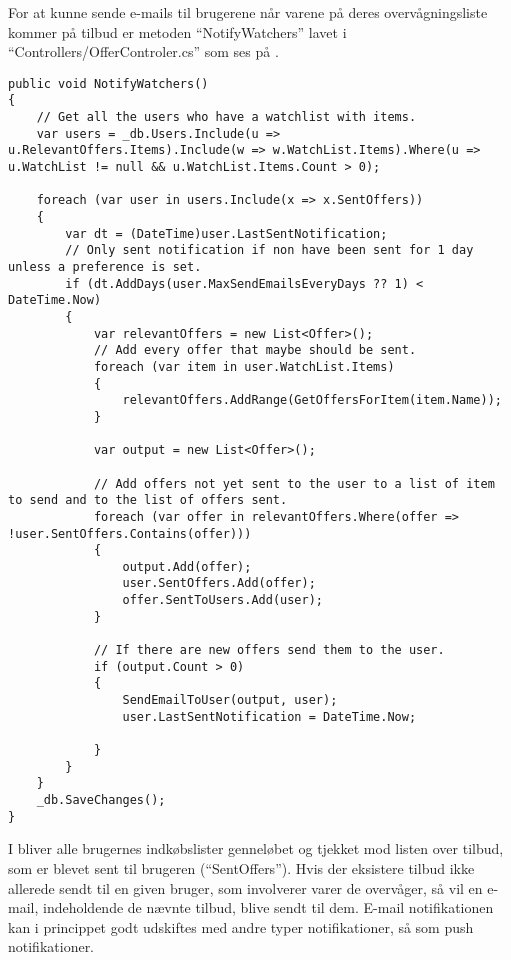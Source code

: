 For at kunne sende e-mails til brugerene når varene på deres overvågningsliste kommer på tilbud er metoden ``NotifyWatchers'' lavet i ``Controllers/OfferControler.cs'' som ses på . 
\begin{lstlisting}[caption="Metoden ``NotifyWatcher som finder de tilbud som skal sendes til hver user og sender dem.''",label=notifywatcherlisting]
public void NotifyWatchers()
{
    // Get all the users who have a watchlist with items.
    var users = _db.Users.Include(u => u.RelevantOffers.Items).Include(w => w.WatchList.Items).Where(u => u.WatchList != null && u.WatchList.Items.Count > 0);

    foreach (var user in users.Include(x => x.SentOffers))
    {
        var dt = (DateTime)user.LastSentNotification;
        // Only sent notification if non have been sent for 1 day unless a preference is set.
        if (dt.AddDays(user.MaxSendEmailsEveryDays ?? 1) < DateTime.Now)
        {
            var relevantOffers = new List<Offer>();
            // Add every offer that maybe should be sent. 
            foreach (var item in user.WatchList.Items)
            {
                relevantOffers.AddRange(GetOffersForItem(item.Name));
            }

            var output = new List<Offer>();

            // Add offers not yet sent to the user to a list of item to send and to the list of offers sent.
            foreach (var offer in relevantOffers.Where(offer => !user.SentOffers.Contains(offer)))
            {
                output.Add(offer);
                user.SentOffers.Add(offer);
                offer.SentToUsers.Add(user);
            }

            // If there are new offers send them to the user.
            if (output.Count > 0)
            {
                SendEmailToUser(output, user);
                user.LastSentNotification = DateTime.Now;

            }
        }
    }
    _db.SaveChanges();
}
\end{lstlisting}
I  bliver alle brugernes indkøbslister genneløbet og tjekket mod listen over tilbud, som er blevet sent til brugeren (``SentOffers''). 
Hvis der eksistere tilbud ikke allerede sendt til en given bruger, som involverer varer de overvåger, så vil en e-mail, indeholdende de nævnte tilbud, blive sendt til dem. 
E-mail notifikationen kan i princippet godt udskiftes med andre typer notifikationer, så som push notifikationer. %
